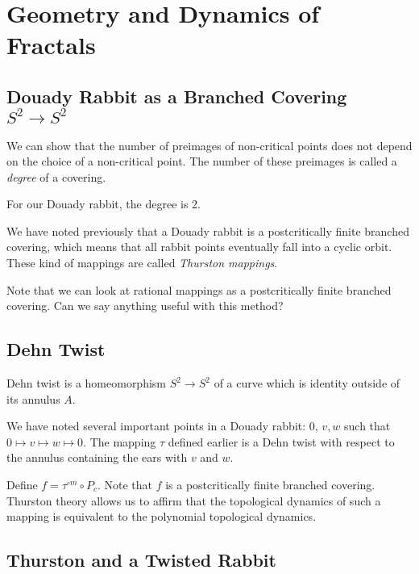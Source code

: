 \documentclass[11pt]{scrartcl}
\begin{document}
  \section{Geometry and Dynamics of Fractals}

  \subsection{Douady Rabbit as a Branched Covering $S^{2} \to S^{2}$}
  
  We can show that the number of preimages of non-critical points does
  not depend on the choice of a non-critical point. The number of
  these preimages is called a \textit{degree} of a covering.

  For our Douady rabbit, the degree is 2.

  We have noted previously that a Douady rabbit is a postcritically
  finite branched covering, which means that all rabbit points
  eventually fall into a cyclic orbit. These kind of mappings are
  called \textit{Thurston mappings}.

  Note that we can look at rational mappings as a postcritically
  finite branched covering. Can we say anything useful with this method?

  \subsection{Dehn Twist}

  \begin{definition}
    Dehn twist is a homeomorphism $S^{2} \to S^{2}$ of a curve which
    is identity outside of its annulus $A$.
  \end{definition}

  We have noted several important points in a Douady rabbit: 0, $v, w$
  such that $0 \mapsto v \mapsto w \mapsto 0$. The mapping $\tau$
  defined earlier is a Dehn twist with respect to the annulus
  containing the ears with $v$ and $w$.

  Define $f = \tau^{\circ m}\circ P_{c}$. Note that $f$ is a
  postcritically finite branched covering. Thurston theory allows us
  to affirm that the topological dynamics of such a mapping is
  equivalent to the polynomial topological dynamics.

  \subsection{Thurston and a Twisted Rabbit}
\end{document}
